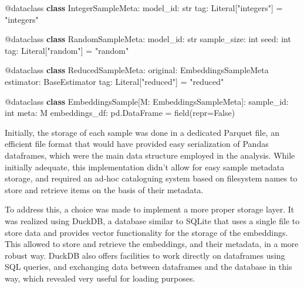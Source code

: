 \documentclass[
  a4paper, twoside, 10pt, titlepage]{book}
\newenvironment{Shaded}{}{}
\newcommand{\AttributeTok}[1]{\textcolor[rgb]{0.49,0.56,0.16}{#1}}
\newcommand{\BuiltInTok}[1]{\textcolor[rgb]{0.00,0.50,0.00}{#1}}
\newcommand{\KeywordTok}[1]{\textcolor[rgb]{0.00,0.44,0.13}{\textbf{#1}}}
\newcommand{\NormalTok}[1]{#1}
\newcommand{\OperatorTok}[1]{\textcolor[rgb]{0.40,0.40,0.40}{#1}}
\newcommand{\StringTok}[1]{\textcolor[rgb]{0.25,0.44,0.63}{#1}}
\newcommand{\VariableTok}[1]{\textcolor[rgb]{0.10,0.09,0.49}{#1}}
\begin{document}
\begin{Shaded}
\begin{Highlighting}[]

\AttributeTok{@dataclass}
\KeywordTok{class}\NormalTok{ IntegerSampleMeta:}
\NormalTok{    model\_id: }\BuiltInTok{str}
\NormalTok{    tag: Literal[}\StringTok{"integers"}\NormalTok{] }\OperatorTok{=} \StringTok{"integers"}

\AttributeTok{@dataclass}
\KeywordTok{class}\NormalTok{ RandomSampleMeta:}
\NormalTok{model\_id: }\BuiltInTok{str}
\NormalTok{    sample\_size: }\BuiltInTok{int}
\NormalTok{    seed: }\BuiltInTok{int}
\NormalTok{    tag: Literal[}\StringTok{"random"}\NormalTok{] }\OperatorTok{=} \StringTok{"random"}

\AttributeTok{@dataclass}
\KeywordTok{class}\NormalTok{ ReducedSampleMeta:}
\NormalTok{    original: EmbeddingsSampleMeta}
\NormalTok{    estimator: BaseEstimator}
\NormalTok{    tag: Literal[}\StringTok{"reduced"}\NormalTok{] }\OperatorTok{=} \StringTok{"reduced"}

\AttributeTok{@dataclass}
\KeywordTok{class}\NormalTok{ EmbeddingsSample[M: EmbeddingsSampleMeta]:}
\NormalTok{    sample\_id: }\BuiltInTok{int}
\NormalTok{    meta: M}
\NormalTok{    embeddings\_df: pd.DataFrame }\OperatorTok{=}\NormalTok{ field(}\BuiltInTok{repr}\OperatorTok{=}\VariableTok{False}\NormalTok{)}
\end{Highlighting}
\end{Shaded}

Initially, the storage of each sample was done in a dedicated Parquet
file, an efficient file format that would have provided easy
serialization of Pandas dataframes, which were the main data structure
employed in the analysis. While initially adequate, this implementation
didn't allow for easy sample metadata storage, and required an ad-hoc
cataloguing system based on filesystem names to store and retrieve items
on the basis of their metadata.

To address this, a choice was made to implement a more proper storage
layer. It was realized using DuckDB, a database similar to SQLite that
uses a single file to store data and provides vector functionality for
the storage of the embeddings. This allowed to store and retrieve the
embeddings, and their metadata, in a more robust way. DuckDB also offers
facilities to work directly on dataframes using SQL queries, and
exchanging data between dataframes and the database in this way, which
revealed very useful for loading purposes.
\end{document}
